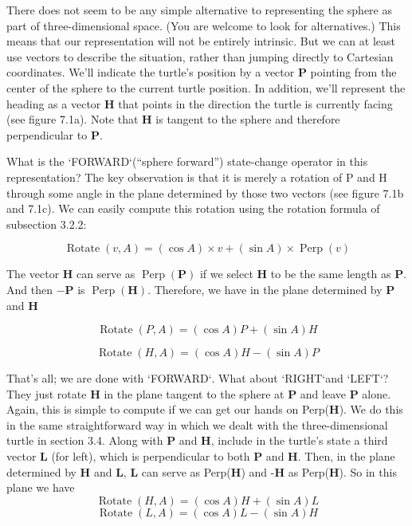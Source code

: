 \documentclass{book}
\begin{document}
There does not seem to be any simple alternative to representing the
sphere as part of three-dimensional space. (You are welcome to look for
alternatives.) This means that our representation will not be entirely
intrinsic. But we can at least use vectors to describe the situation,
rather than jumping directly to Cartesian coordinates. We'll indicate
the turtle's position by a vector \textbf{P} pointing from the center of the sphere
to the current turtle position. In addition, we'll represent the heading
as a vector \textbf{H} that points in the direction the turtle is currently facing
(see figure 7.1a). Note that \textbf{H} is tangent to the sphere and therefore
perpendicular to \textbf{P}.

What is the \textsc{`FORWARD`}(``sphere forward'') state-change operator in this
representation? The key observation is that it is merely a rotation of P
and H through some angle in the plane determined by those two vectors
(see figure 7.1b and 7.1c). We can easily compute this rotation using the
rotation formula of subsection 3.2.2:

$$\operatorname{Rotate}(v,A) = (\cos A) \times v + (\sin A) \times \operatorname{Perp}(v)$$

The vector \textbf{H} can serve as $\operatorname{Perp}(\mathbf{P})$ if we select \textbf{H} to be the same length as
\textbf{P}. And then $-\mathbf{P}$ is $\operatorname{Perp}(\mathbf{H})$. Therefore, we have in the plane determined
by \textbf{P} and \textbf{H}

$$ \operatorname{Rotate}(P,A) = (\cos A)P + (\sin A)H $$

$$ \operatorname{Rotate}(H,A) = (\cos A)H - (\sin A)P $$

That's all; we are done with \textsc{`FORWARD`}.
What about \textsc{`RIGHT`}and \textsc{`LEFT`}?They just rotate \textbf{H} in the plane tangent
to the sphere at \textbf{P} and leave \textbf{P} alone. Again, this is simple to compute
if we can get our hands on Perp(\textbf{H}). We do this in the same straightforward way in which we dealt with the three-dimensional turtle in section
3.4. Along with \textbf{P} and \textbf{H}, include in the turtle's state a third vector \textbf{L}
(for left), which is perpendicular to both \textbf{P} and \textbf{H}. Then, in the plane
determined by \textbf{H} and \textbf{L}, \textbf{L} can serve as Perp(\textbf{H}) and -\textbf{H} as Perp(\textbf{H}). So
in this plane we have $$\operatorname{Rotate}(H, A) = (\cos A)H + (\sin A)L$$
$$\operatorname{Rotate}(L, A) = (\cos A)L - (\sin A)H$$
\end{document}
